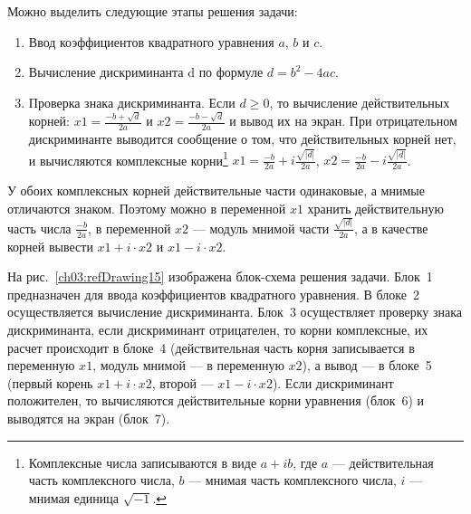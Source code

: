 Можно выделить следующие этапы решения задачи:
\begin{enumerate}
\item Ввод коэффициентов квадратного уравнения $a$, $b$ и $c$.
\item Вычисление дискриминанта d по формуле  $d=b^2-4ac$.
\item Проверка знака дискриминанта. Если $d\geqslant 0$, то вычисление действительных корней:
 $x1=\frac{-b+\sqrt{d}}{2a}$  и  $x2=\frac{-b-\sqrt{d}}{2a}$ 
и вывод их на экран. При отрицательном дискриминанте выводится сообщение о том, что действительных корней нет, и
вычисляются комплексные корни\footnote{Комплексные числа записываются в виде
$a+ib$, где $a$ --- действительная часть комплексного числа,
$b$ --- мнимая часть комплексного числа, $i$ --- мнимая единица  $\sqrt{-1}$.}
 $x1=\frac{-b}{2a}+i\frac{\sqrt{\left|{d}\right|}}{2a}$, 
$x2=\frac{-b}{2a}-i\frac{\sqrt{\left|{d}\right|}}{2a}$.
\end{enumerate}

У обоих комплексных корней действительные части одинаковые, а мнимые отличаются знаком. Поэтому можно в переменной
$x1$ хранить действительную часть числа  $\frac{-b}{2a}$, в переменной $x2$ --- модуль мнимой части 
$\frac{\sqrt{\left|{d}\right|}}{2a}$, а в качестве корней вывести 
$x1 + i\cdot x2$  и  $x1 - i\cdot x2$. 

На рис.~\ref{ch03:refDrawing15} изображена блок-схема решения задачи. Блок~1 предназначен для ввода коэффициентов квадратного
уравнения. В блоке~2 осуществляется вычисление дискриминанта. Блок~3 осуществляет проверку знака дискриминанта, если
дискриминант отрицателен, то корни комплексные, их расчет происходит в блоке~4 (действительная часть корня записывается
в переменную $x1$, модуль мнимой --- в переменную $x2$), а вывод --- в блоке~5 (первый
корень $x1 + i\cdot x2$, второй --- $x1 - i\cdot x2$). Если дискриминант положителен, то
вычисляются действительные корни уравнения (блок~6) и выводятся на экран (блок~7).

